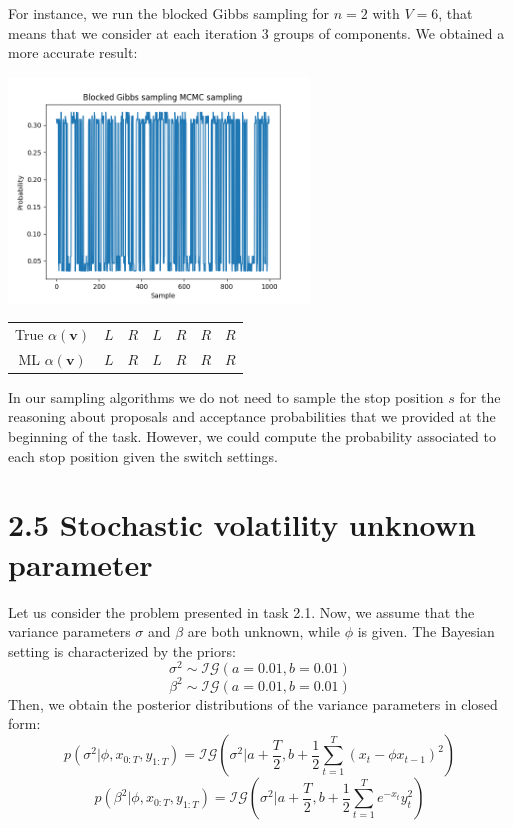 \documentclass[]{article}
\begin{document}
For instance, we run the blocked Gibbs sampling for $n=2$ with $V=6$, that means that we consider at each iteration 3 groups of components. We obtained a more accurate result:
\begin{center}
	\includegraphics[height=6cm]{task3/V_6_T_6_N_10000_Blocked_Gibbs.png}
	\begin{tabular}{| c | c | c | c | c | c | c |}
		True $\alpha(\mathbf{v})$ & $L$ & $R$ & $L$ & $R$ & $R$ & $R$ \\
		ML $\alpha(\mathbf{v})$ & $L$ & $R$ & $L$ & $R$ & $R$ & $R$ \\
	\end{tabular}
\end{center}

In our sampling algorithms we do not need to sample the stop position $s$ for the reasoning about proposals and acceptance probabilities that we provided at the beginning of the task. However, we could compute the probability associated to each stop position given the switch settings. 

\newpage

\section*{2.5 Stochastic volatility unknown parameter}
Let us consider the problem presented in task 2.1. Now, we assume that the variance parameters $\sigma$ and $\beta$ are both unknown, while $\phi$ is given. The Bayesian setting is characterized by the priors:
$$
\sigma^2 \sim \mathcal{IG}(a=0.01, b=0.01)
$$
$$
\beta^2 \sim \mathcal{IG}(a=0.01, b=0.01)
$$
Then, we obtain the posterior distributions of the variance parameters in closed form:
$$
p(\sigma^2|\phi, x_{0:T}, y_{1:T}) = \mathcal{IG}(\sigma^2|a+\frac{T}{2}, b+\frac{1}{2}\sum_{t=1}^{T}(x_t-\phi x_{t-1})^2)
$$
$$
p(\beta^2|\phi, x_{0:T}, y_{1:T}) = \mathcal{IG}(\sigma^2|a+\frac{T}{2}, b+\frac{1}{2}\sum_{t=1}^{T}e^{-x_t}y_t^2)
$$
\end{document}
